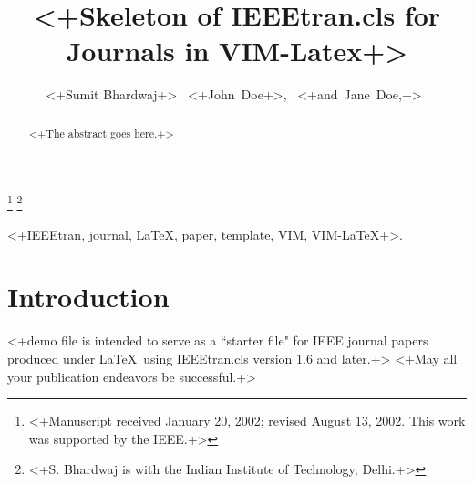 \documentclass[journal]{IEEEtran}
\begin{document}
%
\title{<+Skeleton of IEEEtran.cls for Journals in VIM-Latex+>}
%
%
\author{<+Sumit Bhardwaj+>~
<+John~Doe+>,~
<+and~Jane~Doe,+>~}%
\thanks{<+Manuscript received January 20, 2002; revised August 13, 2002.
This work was supported by the IEEE.+>}%
\thanks{<+S. Bhardwaj is with the Indian Institute of Technology, Delhi.+>}
%




\maketitle


\begin{abstract}
<+The abstract goes here.+>
\end{abstract}

\begin{keywords}
<+IEEEtran, journal, \LaTeX, paper, template, VIM, VIM-\LaTeX+>.
\end{keywords}

\section{Introduction}
 <+demo file is intended to serve as a ``starter file"
for IEEE journal papers produced under \LaTeX\ using IEEEtran.cls version
1.6 and later.+>
<+May all your publication endeavors be successful.+>
\end{document}
